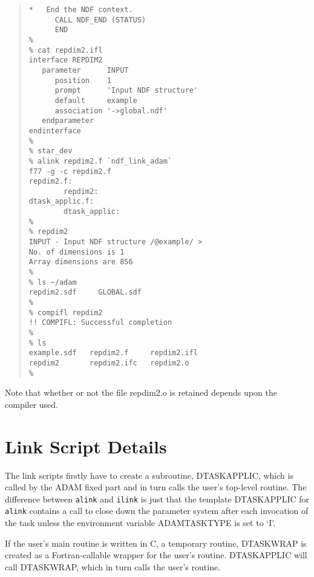\documentclass[twoside,11pt]{article}
\newcommand{\xlabel}[1]{}
\renewcommand{\_}{\texttt{\symbol{95}}}
\begin{document}
\begin{quote}
\begin{verbatim}
*   End the NDF context.                                       
      CALL NDF_END (STATUS)                                  
      END                 
%
% cat repdim2.ifl
interface REPDIM2
   parameter      INPUT
      position    1 
      prompt      'Input NDF structure'
      default     example
      association '->global.ndf'
   endparameter
endinterface
%
% star_dev
% alink repdim2.f `ndf_link_adam`
f77 -g -c repdim2.f
repdim2.f:
        repdim2:
dtask_applic.f:
        dtask_applic:
%
% repdim2
INPUT - Input NDF structure /@example/ >
No. of dimensions is 1
Array dimensions are 856
%
% ls ~/adam
repdim2.sdf     GLOBAL.sdf
%  
% compifl repdim2
!! COMPIFL: Successful completion
%
% ls
example.sdf   repdim2.f     repdim2.ifl
repdim2       repdim2.ifc   repdim2.o
%

\end{verbatim} \end{quote}
Note that whether or not the file repdim2.o is retained depends upon the
compiler used.

\newpage
\section{\xlabel{link_script_details}\label{link_det}Link Script Details}
The link scripts firstly have to create a subroutine, DTASK\_APPLIC, which is
called by the ADAM fixed part and in turn calls the user's top-level
routine.
The difference between \texttt{alink} and \texttt{ilink} is just that the 
template DTASK\_APPLIC for \texttt{alink} contains a call to close down the 
parameter system after each invocation of the task unless the environment 
variable ADAM\_TASK\_TYPE is set to `I'.

If the user's main routine is written in C, a temporary routine,
DTASK\_WRAP is created as a Fortran-callable wrapper for the user's
routine. DTASK\_APPLIC will call DTASK\_WRAP, which in turn calls the user's
routine.
\end{document}
